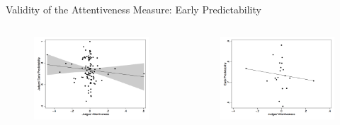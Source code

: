 \begin{frame}{Validity of the Attentiveness Measure: Early Predictability}
    \begin{columns}

        \begin{column}{0.45\textwidth}
            \begin{figure}
            \centering
            \includegraphics[height = 0.6 \textheight]{images/ep1.png}
            \end{figure}
        \end{column}
        
        \begin{column}{0.45\textwidth}
            \begin{figure}
                \centering
                \includegraphics[height = 0.6 \textheight]{images/ep1_bin.png}
            \end{figure}
        \end{column}
        \end{columns}
    
\end{frame}

